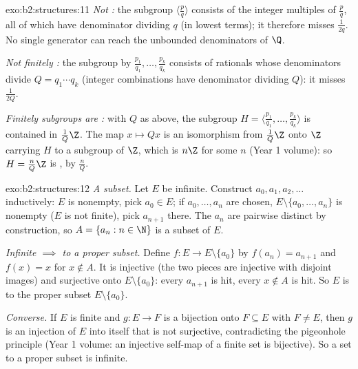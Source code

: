 \begin{solution}{exo:b2:structures:11}
\emph{Not :} the subgroup $\langle \frac pq\rangle$ consists
of the integer multiples of $\frac pq$, all of which have
denominator dividing $q$ (in lowest terms); it therefore misses
$\frac{1}{2q}$. No single generator can reach the unbounded
denominators of $\Q$.

\emph{Not finitely :} the subgroup  by
$\frac{p_1}{q_1}, \dots, \frac{p_k}{q_k}$ consists of rationals
whose denominators divide $Q = q_1 \cdots q_k$ (integer combinations
have denominator dividing $Q$): it misses $\frac{1}{2Q}$.

\emph{Finitely  subgroups are :} with $Q$ as above,
the subgroup $H = \langle \frac{p_1}{q_1}, \dots,
\frac{p_k}{q_k}\rangle$ is contained in $\frac{1}{Q}\Z$. The map $x
\mapsto Qx$ is an isomorphism from $\frac1Q\Z$ onto $\Z$ carrying
$H$ to a subgroup of $\Z$, which is $n\Z$ for some $n$ (Year 1
volume): so $H = \frac{n}{Q}\Z$ is ,  by
$\frac nQ$.
\end{solution}

\begin{solution}{exo:b2:structures:12}
\emph{A  subset.} Let $E$ be infinite. Construct $a_0,
a_1, a_2, \dots$ inductively: $E$ is nonempty, pick $a_0 \in E$;
if $a_0, \dots, a_n$ are chosen, $E \setminus \{a_0, \dots,
a_n\}$ is nonempty ($E$ is not finite), pick $a_{n+1}$ there. The
$a_n$ are pairwise distinct by construction, so $A = \{a_n : n
\in \N\}$ is a  subset of $E$.

\emph{Infinite $\implies$  to a proper subset.} Define
$f \colon E \to E \setminus \{a_0\}$ by $f(a_n) = a_{n+1}$ and
$f(x) = x$ for $x \notin A$. It is injective (the two pieces are
injective with disjoint images) and surjective onto $E \setminus
\{a_0\}$: every $a_{n+1}$ is hit, every $x \notin A$ is hit. So
$E$ is  to the proper subset $E \setminus \{a_0\}$.

\emph{Converse.} If $E$ is finite and $g \colon E \to F$ is a
bijection onto $F \subseteq E$ with $F \neq E$, then $g$ is an
injection of $E$ into itself that is not surjective,
contradicting the pigeonhole principle (Year 1 volume: an
injective self-map of a finite set is bijective). So a set
 to a proper subset is infinite.
\end{solution}

